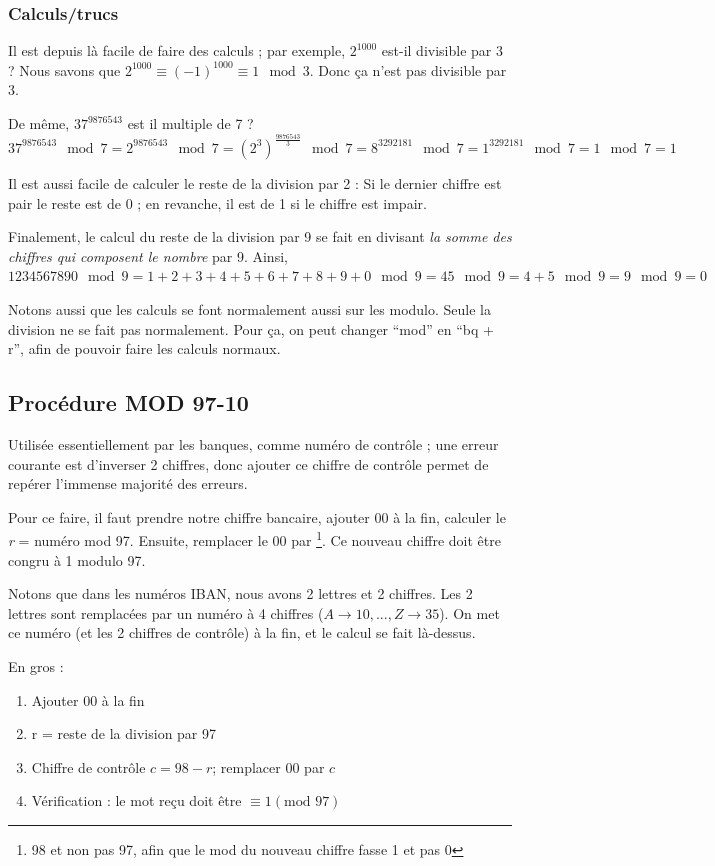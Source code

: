 \documentclass[11pt,a4paper]{article}
\begin{document}
\subsubsection{Calculs/trucs}
Il est depuis là facile de faire des calculs ; par exemple, $2^{1000}$ est-il divisible par 3 ? Nous savons que $2^{1000} \equiv (-1)^{1000} \equiv 1 \mod 3$. Donc ça n'est pas divisible par 3.

De même, $37^{9876543}$ est il multiple de 7 ? $37^{9876543} \mod 7 = 2^{9876543} \mod 7 = 	(2^3)^{\frac{9876543}{3}} \mod 7 = 8^{3292181} \mod 7 = 1^{3292181} \mod 7 = 1 \mod 7 = 1$

Il est aussi facile de calculer le reste de la division par 2 : Si le dernier chiffre est pair le reste est de 0 ; en revanche, il  est de 1 si le chiffre est impair.

Finalement, le calcul du reste de la division par 9 se fait en divisant \textit{la somme des chiffres qui composent le nombre} par 9. Ainsi, $1234567890 \mod 9 = 1+2+3+4+5+6+7+8+9+0 \mod 9 = 45 \mod 9 = 4+5 \mod 9 = 9 \mod 9 = 0$

Notons aussi que les calculs se font normalement aussi sur les modulo. Seule la division ne se fait pas normalement. Pour ça, on peut changer \enquote{mod} en \enquote{bq + r}, afin de pouvoir faire les calculs normaux.
\subsection{Procédure MOD 97-10}
Utilisée essentiellement par les banques, comme numéro de contrôle ; une erreur courante est d'inverser 2 chiffres, donc ajouter ce chiffre de contrôle permet de repérer l'immense majorité des erreurs.

Pour ce faire, il faut prendre notre chiffre bancaire, ajouter 00 à la fin, calculer le \textit{r} = numéro mod 97. Ensuite, remplacer le 00 par \footnote{98 et non pas 97, afin que le mod du nouveau chiffre fasse 1 et pas 0}. Ce nouveau chiffre doit être congru à 1 modulo 97.

Notons que dans les numéros IBAN, nous avons 2 lettres et 2 chiffres. Les 2 lettres sont remplacées par un numéro à 4 chiffres ($A\to 10,...,Z\to 35$). On met ce numéro (et les 2 chiffres de contrôle) à la fin, et le calcul se fait là-dessus.

En gros :
\begin{enumerate}
	\item 	Ajouter 00 à la fin
	\item 	r = reste de la division par 97
	\item 	Chiffre de contrôle $c = 98-r$; remplacer 00 par $c$
	\item 	Vérification : le mot reçu doit être $\equiv 1 (\text{mod }97)$
\end{enumerate}
\end{document}

